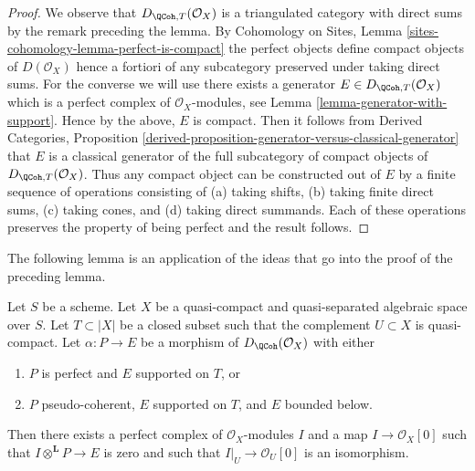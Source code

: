 \begin{proof}
We observe that $D_{\QCoh, T}(\mathcal{O}_X)$ is a triangulated
category with direct sums by the remark preceding the lemma.
By Cohomology on Sites, Lemma \ref{sites-cohomology-lemma-perfect-is-compact}
the perfect objects define compact objects of $D(\mathcal{O}_X)$
hence a fortiori of any subcategory preserved under taking direct
sums. For the converse we will use there exists a generator
$E \in D_{\QCoh, T}(\mathcal{O}_X)$ which is a perfect complex
of $\mathcal{O}_X$-modules, see
Lemma \ref{lemma-generator-with-support}.
Hence by the above, $E$ is compact. Then it follows from
Derived Categories, Proposition
\ref{derived-proposition-generator-versus-classical-generator}
that $E$ is a classical generator of the full subcategory
of compact objects of $D_{\QCoh, T}(\mathcal{O}_X)$.
Thus any compact object can be constructed out of $E$ by
a finite sequence of operations consisting of
(a) taking shifts, (b) taking finite direct sums, (c) taking cones, and
(d) taking direct summands. Each of these operations preserves
the property of being perfect and the result follows.
\end{proof}

\noindent
The following lemma is an application of the ideas that go into
the proof of the preceding lemma.

\begin{lemma}
\label{lemma-map-from-pseudo-coherent-to-complex-with-support}
Let $S$ be a scheme. Let $X$ be a quasi-compact and quasi-separated
algebraic space over $S$. Let $T \subset |X|$
be a closed subset such that the complement $U \subset X$ is quasi-compact.
Let $\alpha : P \to E$ be a morphism of $D_\QCoh(\mathcal{O}_X)$ with
either
\begin{enumerate}
\item $P$ is perfect and $E$ supported on $T$, or
\item $P$ pseudo-coherent, $E$ supported on $T$, and $E$ bounded below.
\end{enumerate}
Then there exists a perfect complex of $\mathcal{O}_X$-modules $I$
and a map $I \to \mathcal{O}_X[0]$ such that
$I \otimes^\mathbf{L} P \to E$ is zero and such that
$I|_U \to \mathcal{O}_U[0]$ is an
isomorphism.
\end{lemma}

